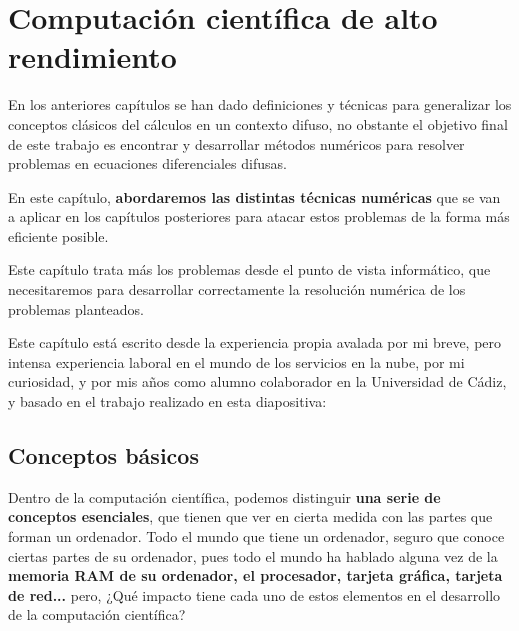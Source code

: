 
\chapter{Computación científica de alto rendimiento}
En los anteriores capítulos se han dado definiciones y técnicas para generalizar los conceptos clásicos del cálculos en un contexto difuso, no obstante el objetivo final de este trabajo es encontrar y desarrollar métodos numéricos para resolver problemas en ecuaciones diferenciales difusas.

En este capítulo, \textbf{abordaremos las distintas técnicas numéricas} que se van a aplicar en los capítulos posteriores para atacar estos problemas de la forma más eficiente posible. 

Este capítulo trata más los problemas desde el punto de vista informático, que necesitaremos para desarrollar correctamente la resolución numérica de los problemas planteados.

Este capítulo está escrito desde la experiencia propia avalada por mi breve, pero intensa experiencia laboral en el mundo de los servicios en la nube, por mi curiosidad, y por mis años como alumno colaborador en la Universidad de Cádiz, y basado en el trabajo realizado en esta diapositiva: \cite{paralelo}

\section{Conceptos básicos}
Dentro de la computación científica, podemos distinguir \textbf{una serie de conceptos esenciales}, que tienen que ver en cierta medida con las partes que forman un ordenador. Todo el mundo que tiene un ordenador, seguro que conoce ciertas partes de su ordenador, pues todo el mundo ha hablado alguna vez de la \textbf{memoria RAM de su ordenador, el procesador, tarjeta gráfica, tarjeta de red...} pero, ¿Qué impacto tiene cada uno de estos elementos en el desarrollo de la computación científica?

